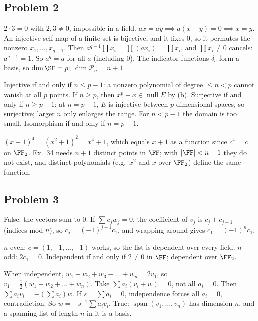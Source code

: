 \documentclass[11pt]{scrartcl}
\DeclareMathOperator{\nul}{null}
\DeclareMathOperator{\spn}{span}
\newcommand{\PP}{\mathcal P}
\begin{document}
\subsection*{Problem 2}
\begin{enumerate}[(a)]
  \ii $2\cdot3=0$ with $2,3\ne0$, impossible in a field.
  \ii $ax=ay\implies a(x-y)=0\implies x=y$.
  An injective self-map of a finite set is bijective, and it fixes $0$, so it permutes the nonzero $x_1,\dots,x_{q-1}$.
  Then $a^{q-1}\prod x_i=\prod(ax_i)=\prod x_i$, and $\prod x_i\ne0$ cancels: $a^{q-1}=1$.
  So $a^q=a$ for all $a$ (including $0$).
  \ii The indicator functions $\delta_c$ form a basis, so $\dim\SF=p$; $\dim\PP_n=n+1$.
  \begin{itemize}
    \ii Injective if and only if $n\le p-1$: a nonzero polynomial of degree $\le n<p$ cannot vanish at all $p$ points.
    If $n\ge p$, then $x^p-x\in\nul E$ by (b).
    \ii Surjective if and only if $n\ge p-1$: at $n=p-1$, $E$ is injective between $p$-dimensional spaces, so surjective; larger $n$ only enlarges the range.
    For $n<p-1$ the domain is too small.
    \ii Isomorphism if and only if $n=p-1$.
  \end{itemize}
  \ii $(x+1)^4=(x^2+1)^2=x^4+1$, which equals $x+1$ as a function since $c^4=c$ on $\FF_2$.
  Ex.~34 needs $n+1$ distinct points in $\FF$; with $|\FF|<n+1$ they do not exist, and distinct polynomials (e.g.\ $x^2$ and $x$ over $\FF_2$) define the same function.
\end{enumerate}

\subsection*{Problem 3}
\begin{enumerate}[(a)]
  \ii False: the vectors sum to $0$.
  \ii If $\sum c_jw_j=0$, the coefficient of $v_j$ is $c_j+c_{j-1}$ (indices mod $n$), so $c_j=(-1)^{j-1}c_1$, and wrapping around gives $c_1=(-1)^nc_1$.
  \begin{itemize}
    \ii $n$ even: $c=(1,-1,\dots,-1)$ works, so the list is dependent over every field.
    \ii $n$ odd: $2c_1=0$. Independent if and only if $2\ne0$ in $\FF$; dependent over $\FF_2$.
  \end{itemize}
  When independent, $w_1-w_2+w_3-\dots+w_n=2v_1$, so $v_1=\tfrac12(w_1-w_2+\dots+w_n)$.
  \ii Take $\sum a_i(v_i+w)=0$, not all $a_i=0$.
  Then $\sum a_iv_i=-(\sum a_i)w$.
  If $s=\sum a_i=0$, independence forces all $a_i=0$, contradiction.
  So $w=-s^{-1}\sum a_iv_i$.
  \ii True: $\spn(v_1,\dots,v_n)$ has dimension $n$, and a spanning list of length $n$ in it is a basis.
\end{enumerate}
\end{document}
